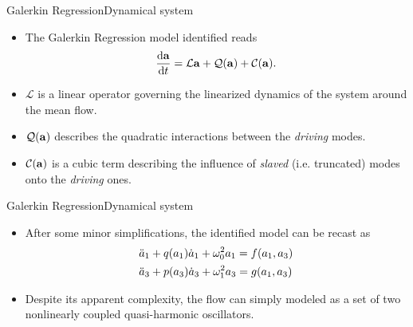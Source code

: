 \documentclass[usenames,dvipsnames,svgnames,10pt,aspectratio=169]{beamer}
\begin{document}
\begin{frame}[t, c]{Galerkin Regression}{Dynamical system}

	\begin{itemize}
		\item The Galerkin Regression model identified reads
		\begin{equation}
			\displaystyle \frac{\mathrm{d}{\bf a}}{\mathrm{d}t} = \mathcal{L}{\bf a} + \mathcal{Q}({\bf a}) + \mathcal{C}({\bf a}).
			\notag
		\end{equation}

		\item $\mathcal{L}$ is a linear operator governing the linearized dynamics of the system around the mean flow.

		\bigskip

		\item $\mathcal{Q}({\bf a})$ describes the quadratic interactions between the \emph{driving} modes.

		\bigskip

		\item $\mathcal{C}({\bf a})$ is a cubic term describing the influence of \emph{slaved} (i.e. truncated) modes onto the \emph{driving} ones.
	\end{itemize}

	\vspace{1cm}
\end{frame}

\begin{frame}[t, c]{Galerkin Regression}{Dynamical system}
	\begin{itemize}
		\item After some minor simplifications, the identified model can be recast as
		\begin{equation}
			\begin{aligned}
				& \ddot{a}_1 + q(a_1) \dot{a}_1 + \omega_0^2 a_1 = f(a_1, a_3) \\
				& \ddot{a}_3 + p(a_3) \dot{a}_3 + \omega_1^2 a_3 = g(a_1, a_3)
			\end{aligned}
			\notag
		\end{equation}

		\bigskip

		\item Despite its apparent complexity, the flow can simply modeled as a set of two nonlinearly coupled quasi-harmonic oscillators.
	\end{itemize}
	\vspace{1cm}
\end{frame}
\end{document}
